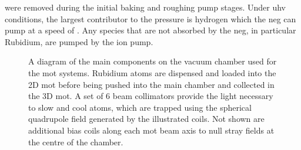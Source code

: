 were removed during the initial baking and roughing pump stages. Under
\ac{uhv} conditions, the largest contributor to the pressure is hydrogen
which the \ac{neg} can pump at a speed of .
Any species that are not absorbed by the \ac{neg}, in particular Rubidium,
are pumped by the  ion pump.
\begin{figure}
    \centering
    \def\svgwidth{1\textwidth}
    
    \caption[\ac{mot} system component diagram]{A diagram of the main components on the vacuum chamber used for the \ac{mot}
systems. Rubidium atoms are dispensed and loaded into the 2D \ac{mot} before
being pushed into the main chamber and collected in the 3D \ac{mot}. A set of
6 beam collimators provide the light necessary to slow and cool atoms, which
are trapped using the spherical quadrupole field generated by the illustrated
coils. Not shown are additional bias coils along each \ac{mot} beam axis to
null stray fields at the centre of the chamber.}
    \label{fig:mot_system}
\end{figure}   
